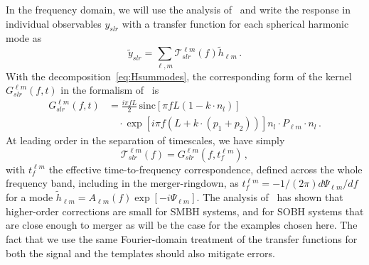 \documentclass[aps,showpacs,twocolumn,prd,superscriptaddress,nofootinbib]{revtex4-1}
\newcommand{\be}{\begin{equation}}
\newcommand{\ee}{\end{equation}}
\newcommand\calT{{\mathcal{T}}}
\newcommand{\nn}{\nonumber}
\newcommand{\sinc}{\,\mathrm{sinc}}
\begin{document}
In the frequency domain, we will use the analysis of~\cite{} and write the response in individual observables $y_{slr}$ with a transfer function for each spherical harmonic mode as
\be
	\tilde{y}_{slr} = \sum_{\ell, m}\calT_{slr}^{\ell m}(f) \tilde{h}_{\ell m} \,.
\ee
With the decomposition~\eqref{eq:Hsummodes}, the corresponding form of the kernel $G^{\ell m}_{slr}(f, t)$ in the formalism of~\cite{} is
\begin{align}\label{eq:Gslr}
	G_{slr}^{\ell m}(f,t) &= \frac{i \pi f L}{2} \sinc \left[ \pi f L\left(1-k\cdot n_{l} \right) \right] \nn\\
	& \quad \cdot \exp\left[ i \pi f \left( L + k\cdot \left( p_{1} + p_{2} \right) \right) \right]  n_{l} \cdot P_{\ell m} \cdot n_{l} \,.
\end{align}
At leading order in the separation of timescales, we have simply
\be
	\calT_{slr}^{\ell m}(f) = G_{slr}^{\ell m}(f, t_{f}^{\ell m}) \,,
\ee
with $t_{f}^{\ell m}$ the effective time-to-frequency correspondence, defined across the whole frequency band, including in the merger-ringdown, as $t_{f}^{\ell m} = -1/(2\pi) d\Psi_{\ell m} / df$ for a mode $\tilde{h}_{\ell m} = A_{\ell m}(f) \exp\left[-i \Psi_{\ell m}\right]$. The analysis of~\cite{} has shown that higher-order corrections are small for SMBH systems, and for SOBH systems that are close enough to merger as will be the case for the examples chosen here. The fact that we use the same Fourier-domain treatment of the transfer functions for both the signal and the templates should also mitigate errors. 
\end{document}
